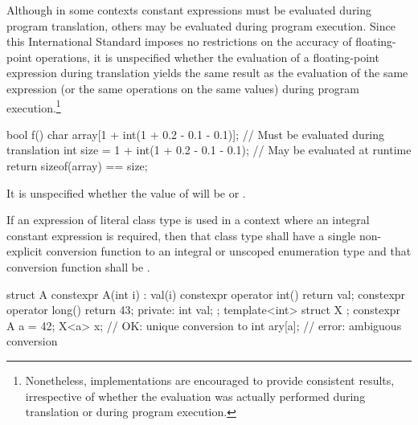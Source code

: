 \pnum
\enternote Although in some contexts constant expressions must be evaluated during program
translation, others may be evaluated during program execution. Since this International Standard
imposes no restrictions on the accuracy of floating-point operations, it is unspecified whether the
evaluation of a floating-point expression during translation yields the same result as the
evaluation of the same expression (or the same operations on the same values) during program
execution.\footnote{Nonetheless, implementations are encouraged to provide consistent results,
irrespective of whether the evaluation was actually performed during translation or during program
execution.} \enterexample

\begin{codeblock}
bool f() {
    char array[1 + int(1 + 0.2 - 0.1 - 0.1)];  // Must be evaluated during translation
    int size = 1 + int(1 + 0.2 - 0.1 - 0.1);   // May be evaluated at runtime
    return sizeof(array) == size;
}
\end{codeblock}
It is unspecified whether the value of  will be  or .
\exitexample \exitnote

\pnum
If an expression of literal class type is used in a context where an 
integral constant expression is required, then that class type shall 
have a single non-explicit conversion function to an integral or unscoped
enumeration type 
and that conversion function shall be . \enterexample
\begin{codeblock}
struct A { 
  constexpr A(int i) : val(i) { } 
  constexpr operator int() { return val; } 
  constexpr operator long() { return 43; } 
private: 
  int val; 
}; 
template<int> struct X { }; 
constexpr A a = 42; 
X<a> x;             // OK: unique conversion to 
int ary[a];         // error: ambiguous conversion 
\end{codeblock}
\exitexample%
